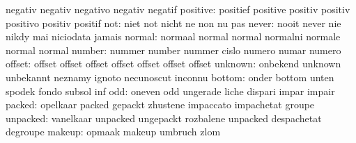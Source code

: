                            negativ                   negativ
                           negativo                  negativ
                           negatif
                 positive: positief                  positive
                           positiv                   positiv
                           positivo                  positiv
                           positif
                      not: niet                      not
                           nicht                     ne
                           non                       nu
                           pas
                    never: nooit                     never
                           nie                       nikdy
                           mai                       niciodata
                           jamais
                   normal: normaal                   normal
                           normal                    normalni
                           normale                   normal
                           normal
                   number: nummer                    number
                           nummer                    cislo
                           numero                    numar
                           numero
                   offset: offset                    offset
                           offset                    offset
                           offset                    offset
                           offset
                  unknown: onbekend                  unknown
                           unbekannt                 neznamy
                           ignoto                    necunoscut
                           inconnu
                   bottom: onder                     bottom
                           unten                     spodek
                           fondo                     subsol
                           inf
                      odd: oneven                    odd
                           ungerade                  liche
                           dispari                   impar
                           impair
                   packed: opelkaar                  packed
                           gepackt                   zhustene
                           impaccato                 impachetat
                           groupe
                 unpacked: vanelkaar                 unpacked
                           ungepackt                 rozbalene
                           unpacked                  despachetat
                           degroupe
                   makeup: opmaak                    makeup
                           umbruch                   zlom
